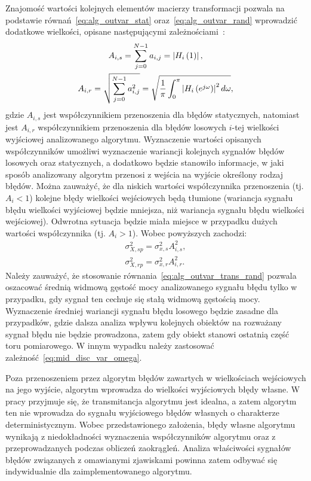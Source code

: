 Znajomość wartości kolejnych elementów macierzy transformacji pozwala na podstawie równań~\eqref{eq:alg_outvar_stat} oraz~\eqref{eq:alg_outvar_rand} wprowadzić dodatkowe wielkości, opisane następującymi zależnościami~\cite{jakubiec_algorithms, oppenheim_dsp, proakis_dsp}:
\begin{gather}
A_{i,s} = \sum _{j = 0} ^{N-1} a_{i, j} = \left| H_{i} \left(1\right) \right| \label{eq:alg_trans_stat}, \\
A_{i,r} = \sqrt{\sum _{j = 0} ^{N-1} a_{i, j}^{2}} = \sqrt{\frac{1}{\pi} \int _{0} ^{\pi} \left| H_{i} \left(e^{j \omega}\right) \right|^{2} d\omega} \label{eq:alg_trans_rand},
\end{gather}
gdzie $A_{i,s}$ jest współczynnikiem przenoszenia dla błędów statycznych, natomiast jest $A_{i,r}$ współczynnikiem przenoszenia dla błędów losowych $i$-tej wielkości wyjściowej analizowanego algorytmu. Wyznaczenie wartości opisanych współczynników umożliwi wyznaczenie wariancji kolejnych sygnałów błędów losowych oraz statycznych, a dodatkowo będzie stanowiło informacje, w jaki sposób analizowany algorytm przenosi z wejścia na wyjście określony rodzaj błędów. Można zauważyć, że dla niskich wartości współczynnika przenoszenia (tj. $A_{i} < 1$) kolejne błędy wielkości wejściowych będą tłumione (wariancja sygnału błędu wielkości wyjściowej będzie mniejsza, niż wariancja sygnału błędu wielkości wejściowej). Odwrotna sytuacja będzie miała miejsce w przypadku dużych wartości współczynnika (tj. $A_{i} > 1$). Wobec powyższych zachodzi:
\begin{gather}
\sigma_{X,sp}^{2} = \sigma_{x,s}^{2} A_{i,s}^{2} \label{eq:alg_outvar_trans_stat}, \\
\sigma_{X,rp}^{2} = \sigma_{x,r}^{2} A_{i,r}^{2} \label{eq:alg_outvar_trans_rand}.
\end{gather}
Należy zauważyć, że stosowanie równania~\eqref{eq:alg_outvar_trans_rand} pozwala oszacować średnią widmową gęstość mocy analizowanego sygnału błędu tylko w przypadku, gdy sygnał ten cechuje się stałą widmową gęstością mocy. Wyznaczenie średniej wariancji sygnału błędu losowego będzie zasadne dla przypadków, gdzie dalsza analiza wpływu kolejnych obiektów na rozważany sygnał błędu nie będzie prowadzona, zatem gdy obiekt stanowi ostatnią część toru pomiarowego. W innym wypadku należy zastosować zależność~\eqref{eq:mid_disc_var_omega}.

Poza przenoszeniem przez algorytm błędów zawartych w wielkościach wejściowych na jego wyjście, algorytm wprowadza do wielkości wyjściowych błędy własne. W pracy przyjmuje się, że transmitancja algorytmu jest idealna, a zatem algorytm ten nie wprowadza do sygnału wyjściowego błędów własnych o charakterze deterministycznym. Wobec przedstawionego założenia, błędy własne algorytmu wynikają z niedokładności wyznaczenia współczynników algorytmu oraz z przeprowadzanych podczas obliczeń zaokrągleń. Analiza właściwości sygnałów błędów związanych z omawianymi zjawiskami powinna zatem odbywać się indywidualnie dla zaimplementowanego algorytmu.


